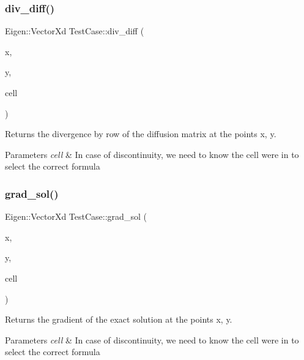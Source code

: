 \subsubsection{\texorpdfstring{div\+\_\+diff()}{div\_diff()}}
{\footnotesize\ttfamily Eigen\+::\+Vector\+Xd Test\+Case\+::div\+\_\+diff (\begin{DoxyParamCaption}\item[{const double}]{x,  }\item[{const double}]{y,  }\item[{const \hyperlink{classHArDCore2D_1_1Cell}{Cell} $\ast$}]{cell }\end{DoxyParamCaption})}



Returns the divergence by row of the diffusion matrix at the points x, y. 


\begin{DoxyParams}{Parameters}
{\em cell} & In case of discontinuity, we need to know the cell we\textquotesingle{}re in to select the correct formula \\
\hline
\end{DoxyParams}
\mbox{\label{classTestCase_a3a498bb6578e46551607ec6ceb164e18}} 
\subsubsection{\texorpdfstring{grad\+\_\+sol()}{grad\_sol()}}
{\footnotesize\ttfamily Eigen\+::\+Vector\+Xd Test\+Case\+::grad\+\_\+sol (\begin{DoxyParamCaption}\item[{const double}]{x,  }\item[{const double}]{y,  }\item[{const \hyperlink{classHArDCore2D_1_1Cell}{Cell} $\ast$}]{cell }\end{DoxyParamCaption})}



Returns the gradient of the exact solution at the points x, y. 


\begin{DoxyParams}{Parameters}
{\em cell} & In case of discontinuity, we need to know the cell we\textquotesingle{}re in to select the correct formula \\
\hline
\end{DoxyParams}
\mbox{\label{classTestCase_a9293e0429bb3ce0c3312406405872329}} 

